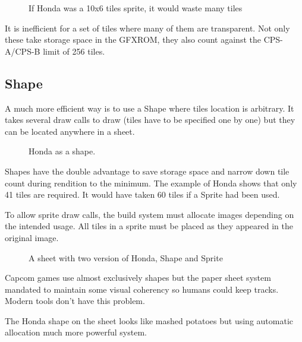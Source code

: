  \begin{figure}[H]
\caption*{If Honda was a 10x6 tiles sprite, it would waste many tiles}
\end{figure}

It is inefficient for a set of tiles where many of them are transparent. Not only these take storage space in the GFXROM, they also count against the CPS-A/CPS-B limit of 256 tiles.

\subsection{Shape}

A much more efficient way is to use a Shape where tiles location is arbitrary. It takes several draw calls to draw (tiles have to be specified one by one) but they can be located anywhere in a sheet.

 \begin{figure}[H]
\caption*{Honda as a shape.}
\end{figure}

Shapes have the double advantage to save storage space and narrow down tile count during rendition to the minimum. The example of Honda shows that only 41 tiles are required. It would have taken 60 tiles if a Sprite had been used.

To allow sprite draw calls, the build system must allocate images depending on the intended usage. All tiles in a sprite must be placed as they appeared in the original image.
 
\begin{figure}[H]
\caption*{A sheet with two version of Honda, Shape and Sprite}
\end{figure}


\begin{trivia}
Capcom games use almost exclusively shapes but the paper sheet system mandated to maintain some visual coherency so humans could keep tracks. Modern tools don't have this problem. 

The Honda shape on the sheet looks like mashed potatoes but using automatic allocation much more powerful system.
\end{trivia}


